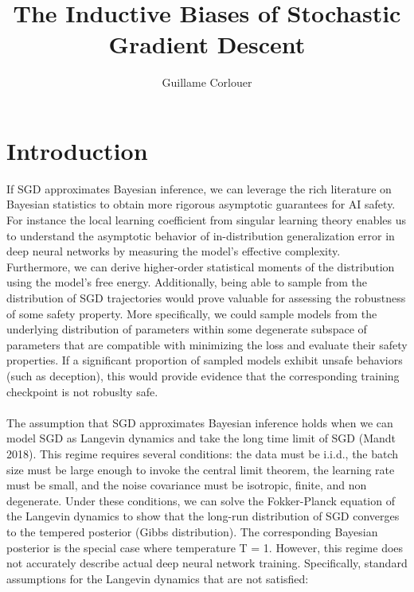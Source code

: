 \documentclass[11pt]{article}
\title{The Inductive Biases of Stochastic Gradient Descent}
\author{Guillame Corlouer}
\begin{document}
\maketitle

\section{Introduction}

If SGD approximates Bayesian inference, we can leverage the rich literature on Bayesian statistics to obtain more rigorous asymptotic guarantees for AI safety. For instance the local learning coefficient from singular learning theory enables us to understand the asymptotic behavior of in-distribution generalization error in deep neural networks by measuring the model's effective complexity. Furthermore, we can derive higher-order statistical moments of the distribution using the model's free energy. Additionally, being able to sample from the distribution of SGD trajectories would prove valuable for assessing the robustness of some safety property. More specifically, we could sample models from the underlying distribution of parameters within some degenerate subspace of parameters that are compatible with minimizing the loss and evaluate their safety properties. If a significant proportion of sampled models exhibit unsafe behaviors (such as deception), this would provide evidence that the corresponding training checkpoint is not robuslty safe.
\\
\\
The assumption that SGD approximates Bayesian inference holds when we can model SGD as Langevin dynamics and take the long time limit of SGD (Mandt 2018). This regime requires several conditions: the data must be i.i.d., the batch size must be large enough to invoke the central limit theorem, the learning rate must be small, and the noise covariance must be isotropic, finite, and non degenerate. Under these conditions, we can solve the Fokker-Planck equation of the Langevin dynamics to show that the long-run distribution of SGD converges to the tempered posterior (Gibbs distribution). The corresponding Bayesian posterior is the special case where temperature T = 1. However, this regime does not accurately describe actual deep neural network training. Specifically, standard assumptions for the Langevin dynamics that are not satisfied:
\end{document}
